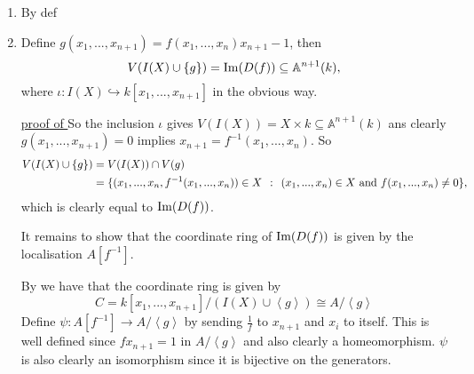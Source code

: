 \documentclass[a4paper,11pt,english]{article}
\def\A{\mathbb{A}}
\begin{document}
\begin{solution}[3]
\begin{enumerate}
\item By def
\item
Define $g(x_1, ..., x_{n+1}) = f(x_1, ..., x_n)x_{n+1} - 1$, then 
\begin{equation}
V(I(X)\cup\{g\}) = \im(D(f)) \subseteq \A^{n+1}(k),
\label{eq:*}
\end{equation}
where $\iota : I(X) \hookrightarrow k[x_1,..., x_{n+1}]$ in the obvious way.

\underline{proof of } 
So the inclusion $\iota$ gives $V(I(X)) = X \times k \subseteq \A^{n+1}(k)$ ans clearly $g(x_1, ..., x_{n+1}) = 0$ implies $x_{n+1} = f^{-1}(x_1,...,x_n)$. So 
\begin{align*}
V(I(X) \cup \{g\}) &= V(I(X)) \cap V(g) \\
&= \{ (x_1,...,x_n, f^{-1}(x_1,...,x_n)) \in X \:\::\:\: (x_1,...,x_n) \in X \text{ and } f(x_1, ..., x_n) \ne 0 \}, 
\end{align*}
which is clearly equal to $\operatorname{Im}(D(f))$.

It remains to show that the coordinate ring of $\operatorname{Im}(D(f))$ is given by the localisation $A[f^{-1}]$.

By  we have that the coordinate ring is given by 
\[ C = k[x_1,...,x_{n+1}] / (I(X)\cup \left<g\right>) \cong  A / \left<g\right> \]
Define $\psi: A[f^{-1}] \to A / \left<g\right>$ by sending $\frac{1}{f}$ to $x_{n+1}$ and $x_i$ to itself. This is well defined since $f x_{n+1} = 1$ in $A / \left<g\right>$ and also clearly a homeomorphism. $\psi$ is also clearly an isomorphism since it is bijective on the generators.
\end{enumerate}

\end{solution}
\end{document}
